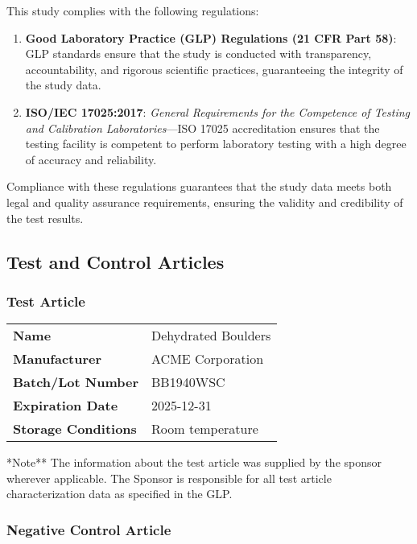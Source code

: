 \documentclass[
  12pt,
]{article}
\begin{document}
This study complies with the following regulations:

\begin{enumerate}
\def\labelenumi{\arabic{enumi}.}
\item
  \textbf{Good Laboratory Practice (GLP) Regulations (21 CFR Part 58)}:
  GLP standards ensure that the study is conducted with transparency,
  accountability, and rigorous scientific practices, guaranteeing the
  integrity of the study data.
\item
  \textbf{ISO/IEC 17025:2017}: \emph{General Requirements for the
  Competence of Testing and Calibration Laboratories}---ISO 17025
  accreditation ensures that the testing facility is competent to
  perform laboratory testing with a high degree of accuracy and
  reliability.
\end{enumerate}

Compliance with these regulations guarantees that the study data meets
both legal and quality assurance requirements, ensuring the validity and
credibility of the test results.

\newpage

\subsection{Test and Control
Articles}\label{test-and-control-articles-1}

\subsubsection{Test Article}\label{test-article}

\begin{longtable}[]{@{}ll@{}}
\toprule\noalign{}
\endhead
\bottomrule\noalign{}
\endlastfoot
\textbf{Name} & Dehydrated Boulders \\
\textbf{Manufacturer} & ACME Corporation \\
\textbf{Batch/Lot Number} & BB1940WSC \\
\textbf{Expiration Date} & 2025-12-31 \\
\textbf{Storage Conditions} & Room temperature \\
\end{longtable}

*Note** The information about the test article was supplied by the
sponsor wherever applicable. The Sponsor is responsible for all test
article characterization data as specified in the GLP.

\subsubsection{Negative Control Article}\label{negative-control-article}
\end{document}
